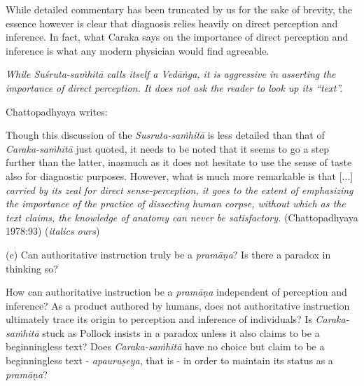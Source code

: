 While detailed commentary has been truncated by us for the sake of brevity, the essence however is clear that diagnosis relies heavily on direct perception and inference.  In fact, what Caraka says on the importance of direct perception and inference is what any modern physician would find agreeable.

{{\sl While Suśruta-saṁhitā calls itself a Vedāṅga, it is aggressive in asserting the importance of direct perception. It does not ask the reader to look up its ``text''.}}

Chattopadhyaya writes:
\begin{myquote}
Though this discussion of the {\sl Susruta-saṁhitā} is less detailed than that of {\sl Caraka-saṁhitā} just quoted, it needs to be noted that it seems to go a step further than the latter, inasmuch as it does not hesitate to use the sense of taste also for diagnostic purposes.  However, what is much more remarkable is that [...] {\sl carried by its zeal for direct sense-perception, it goes to the extent of emphasizing the importance of the practice of dissecting human corpse, without which as the text claims, the knowledge of anatomy can never be satisfactory.}
\hfill (Chattopadhyaya 1978:93) ({\sl italics ours})
\end{myquote}

(c) Can authoritative instruction truly be a {{\sl pramāṇa}\relax}?  Is there a paradox in thinking so?

How can authoritative instruction be a {\sl pramāṇa} independent of perception and inference? As a product authored by humans, does not authoritative instruction ultimately trace its origin to perception and inference of individuals? Is {\sl Caraka-saṁhitā} stuck as Pollock insists in a paradox unless it also claims to be a beginningless text?  Does {\sl Caraka-saṁhitā} have no choice but claim to be a beginningless text - {\sl apauruṣeya}, that is - in order to maintain its status as a {\sl pramāṇa}?

